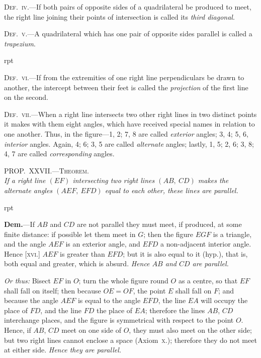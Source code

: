 \documentclass[oneside]{book}
\newcommand\myprop[2]{
\bigskip\Needspace*{4\baselineskip}\begin{center}\textsc{#1}\\\medskip\emph{#2}\par\end{center}
}
\newcommand\imgflow[3]{
\setcounter{wrapwidth}{#1}
\begin{wrapfigure}[#2]{r}{\value{wrapwidth}pt}
\begin{center}
\vspace{-0.3in}
\end{center}
\end{wrapfigure}
}
\begin{document}
\textsc{Def.~iv}.---If both pairs of opposite sides of a quadrilateral
be produced to meet, the right line joining their
points of intersection is called its \emph{third diagonal}.

\textsc{Def.~v}.---A quadrilateral which has one pair of opposite
sides parallel is called a \emph{trapezium}.

\imgflow{110}{8}{f046}

\textsc{Def.~vi}.---If from the extremities of one right line
perpendiculars be drawn to another, the intercept between
their feet is called the \emph{projection} of the first line
on the second.

\textsc{Def.~vii}\label{def8}.---When a right line
intersects two other right lines
in two distinct points it makes
with them eight angles, which
have received special names in
relation to one another. Thus,
in the figure---1, 2; 7, 8 are
called \emph{exterior} angles; 3, 4; 5, 6, \emph{interior} angles.
Again, 4; 6; 3, 5 are called \emph{alternate} angles; lastly,
1, 5; 2, 6; 3, 8; 4, 7 are called \emph{corresponding} angles.

\myprop{PROP\@.~XXVII\@.---Theorem.}{If a right line $(EF)$ intersecting two right lines $(AB,\
CD)$ makes the alternate angles $(AEF,\ EFD)$ equal to
each other, these lines are parallel.}

\imgflow{160}{7}{f047}

\textbf{Dem.}---If $AB$ and $CD$ are not parallel they must meet,
if produced, at some finite
distance: if possible let
them meet in $G$; then
the figure $EGF$ is a triangle,
and the angle $AEF$
is an exterior angle, and
$EFD$ a non-adjacent interior
angle. Hence [\textsc{xvi.}] $AEF$ is greater than $EFD$;
but it is also equal to it (hyp.), that is, both equal and
greater, which is absurd. \emph{Hence $AB$ and $CD$ are
parallel.}\par\medskip


\textit{Or thus:} Bisect $EF$ in $O$; turn the whole figure
round $O$ as a centre, so that $EF$ shall fall on itself;
then because $OE = OF$, the point $E$ shall fall on $F$;
and because the angle $AEF$ is equal to the angle $EFD$,
the line $EA$ will occupy the place of $FD$, and the line
$FD$ the place of $EA$; therefore the lines $AB$, $CD$ interchange
places, and the figure is symmetrical with respect
to the point $O$. Hence, if $AB$, $CD$ meet on one
side of $O$, they must also meet on the other side; but
two right lines cannot enclose a space (Axiom~\textsc{x}.);
therefore they do not meet at either side. \textit{Hence they
are parallel.}
\end{document}
